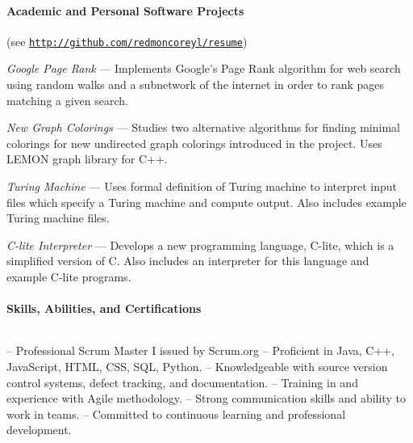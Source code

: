 \documentclass{article}
\begin{document}
  \paragraph{Academic and Personal Software Projects} \hfill (see \href{http://github.com/redmoncoreyl/resume}{\texttt{http://github.com/redmoncoreyl/resume}})%

  \hangindent=0.5in
  \textit{Google Page Rank} --- Implements Google's Page Rank algorithm
  for web search using random walks and a subnetwork of the internet in order to
  rank pages matching a given search.

  \hangindent=0.5in
	\textit{New Graph Colorings} --- Studies two alternative algorithms for
  finding minimal colorings for new undirected graph colorings introduced in the project. Uses LEMON
  graph library for C++.

  \hangindent=0.5in
	\textit{Turing Machine} --- Uses formal definition of Turing machine to
  interpret input files which specify a Turing machine and compute output. Also includes
  example Turing machine files.

  \hangindent=0.5in
	\textit{C-lite Interpreter} --- Develops a new programming language, C-lite, which
  is a simplified version of C. Also includes an interpreter for this language and
  example C-lite programs.

  \paragraph{Skills, Abilities, and Certifications} $ $

  \hangindent=0.4in
  -- Professional Scrum Master I issued by Scrum.org \newline
  -- Proficient in Java, C++, JavaScript, HTML, CSS, SQL, Python. \newline
  -- Knowledgeable with source version control systems, defect tracking, and documentation. \newline
  -- Training in and experience with Agile methodology. \newline
  -- Strong communication skills and ability to work in teams. \newline
  -- Committed to continuous learning and professional development.
\end{document}
